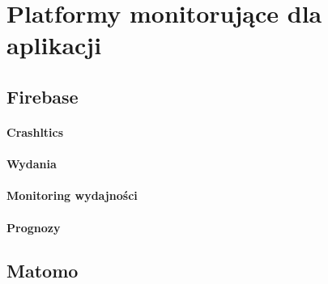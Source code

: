 \section{Platformy monitorujące dla aplikacji}



\subsection{Firebase}

\paragraph{Crashltics}

\paragraph{Wydania}

\paragraph{Monitoring wydajności}

\paragraph{Prognozy}

\subsection{Matomo}

